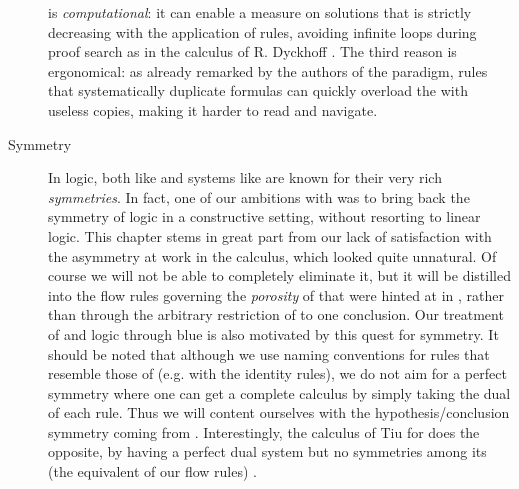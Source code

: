 \begin{scope}
\begin{description}
    is \emph{computational}: it can enable a measure on solutions that is
    strictly decreasing with the application of rules, avoiding infinite loops
    during proof search as in the calculus  of R. Dyckhoff
    \cite{dyckhoff_contraction-free_1992}. The third reason is ergonomical: as
    already remarked by the authors of the 
    paradigm, rules that systematically
    duplicate formulas can quickly overload the  with useless copies, making
    it harder to read and navigate.
  \item[Symmetry] 
    In  logic, both  like  and  systems like  are known for their very rich
    \emph{symmetries}. In fact, one of our ambitions with  was to bring
    back the symmetry of  logic in a constructive setting, without
    resorting to linear logic. This chapter stems in great part from our lack of
    satisfaction with the asymmetry at work in the  calculus, which
    looked quite unnatural. Of course we will not be able to completely
    eliminate it, but it will be distilled into the flow rules governing the
    \emph{porosity} of  that were hinted at in , rather
    than through the arbitrary restriction of  to one
    conclusion. Our
    treatment of  and  logic
    through blue  is also motivated by this quest for symmetry. It should
    be noted that although we use naming conventions for rules that resemble
    those of  (e.g. with the identity rules), we do not aim for a
    perfect symmetry where one can get a complete calculus by simply taking the
    dual of each rule.
    Thus we will content ourselves with the hypothesis/conclusion symmetry
    coming from . Interestingly, the calculus  of Tiu
    for   does the opposite, by having a perfect
    dual system  but no symmetries among its  (the
    equivalent of our flow rules) \cite{tiu_local_2006}.
\end{description}


\end{scope}
